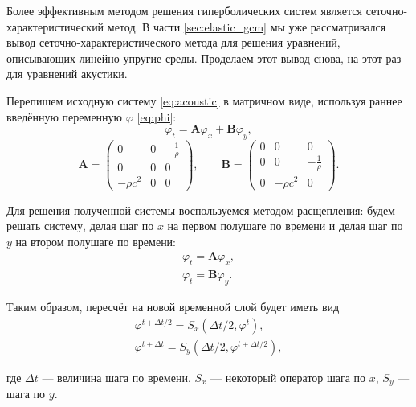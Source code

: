 Более эффективным методом решения гиперболических систем является сеточно-характеристический метод. В части \ref{sec:elastic_gcm} мы уже рассматривался вывод сеточно-характер\-истического метода для решения  уравнений, описывающих линейно-упругие среды. Проделаем этот вывод снова, на этот раз для уравнений акустики.

Перепишем исходную систему \eqref{eq:acoustic} в матричном виде, используя раннее введённую переменную $\varphi$ \eqref{eq:phi}:
\begin{equation*}
	\varphi_t = \pmb{A} \varphi_x +  \pmb{B} \varphi_y ,
\end{equation*}
\begin{equation*}
	\pmb{A} = 
	\begin{pmatrix}
		0 & 0 & -\frac{1}{\rho} \\
		0 & 0 & 0 \\
		-\rho c^2 & 0 & 0			
 	\end{pmatrix} 
 	, \qquad
	\pmb{B} = 
	\begin{pmatrix}
		0 & 0 & 0 \\
		0 & 0 & -\frac{1}{\rho} \\
		0 & -\rho c^2 & 0			
    \end{pmatrix}
    .
\end{equation*}

\noindent Для решения полученной системы воспользуемся методом расщепления: будем решать систему, делая шаг по $x$ на первом полушаге по времени и делая шаг по $y$ на втором полушаге по времени:
\begin{equation}
\begin{gathered}
	\varphi_t = \pmb{A} \varphi_x , \\
	\varphi_t = \pmb{B} \varphi_y .
\end{gathered}
\label{eq:syst_split}
\end{equation} 

\noindent Таким образом, пересчёт на новой временной слой будет иметь вид
\begin{equation}
\begin{gathered}
		\varphi^{t+\Delta t / 2} = S_x(\Delta t / 2, \varphi^t) , \\
		\varphi^{t+\Delta t}     = S_y(\Delta t / 2, \varphi^{t+\Delta t/2}) ,
\end{gathered}
\label{eq:gcm_t_steps}
\end{equation} 

\noindent где $\Delta t$ --- величина шага по времени, $S_x$ --- некоторый  оператор шага по $x$, $S_y$ --- шага по $y$.

